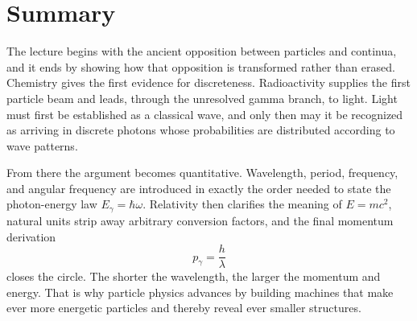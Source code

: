 \section{Summary}

The lecture begins with the ancient opposition between particles and continua, and it ends by showing how that opposition is transformed rather than erased. Chemistry gives the first evidence for discreteness. Radioactivity supplies the first particle beam and leads, through the unresolved gamma branch, to light. Light must first be established as a classical wave, and only then may it be recognized as arriving in discrete photons whose probabilities are distributed according to wave patterns.

From there the argument becomes quantitative. Wavelength, period, frequency, and angular frequency are introduced in exactly the order needed to state the photon-energy law \(E_\gamma=\hbar\omega\). Relativity then clarifies the meaning of \(E=mc^2\), natural units strip away arbitrary conversion factors, and the final momentum derivation
\[
p_\gamma = \frac{h}{\lambda}
\]
closes the circle. The shorter the wavelength, the larger the momentum and energy. That is why particle physics advances by building machines that make ever more energetic particles and thereby reveal ever smaller structures.